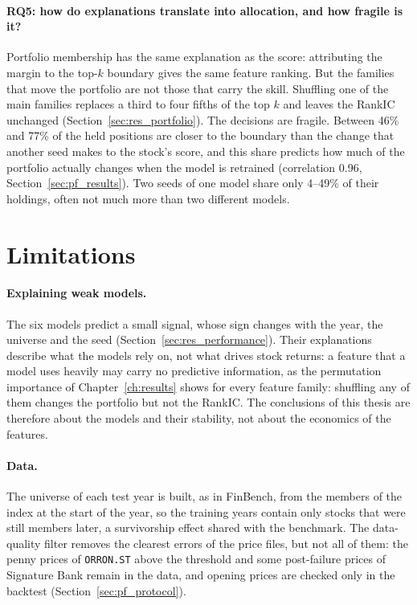 \paragraph{RQ5: how do explanations translate into allocation, and how fragile is it?} Portfolio membership has the same explanation as the score: attributing the margin to the top-$k$ boundary gives the same feature ranking. But the families that move the portfolio are not those that carry the skill. Shuffling one of the main families replaces a third to four fifths of the top $k$ and leaves the RankIC unchanged (Section~\ref{sec:res_portfolio}). The decisions are fragile. Between 46\% and 77\% of the held positions are closer to the boundary than the change that another seed makes to the stock's score, and this share predicts how much of the portfolio actually changes when the model is retrained (correlation 0.96, Section~\ref{sec:pf_results}). Two seeds of one model share only 4--49\% of their holdings, often not much more than two different models.

\section{Limitations}
\label{sec:conc_limitations}

\paragraph{Explaining weak models.} The six models predict a small signal, whose sign changes with the year, the universe and the seed (Section~\ref{sec:res_performance}). Their explanations describe what the models rely on, not what drives stock returns: a feature that a model uses heavily may carry no predictive information, as the permutation importance of Chapter~\ref{ch:results} shows for every feature family: shuffling any of them changes the portfolio but not the RankIC.
The conclusions of this thesis are therefore about the models and their stability, not about the economics of the features.

\paragraph{Data.} The universe of each test year is built, as in FinBench, from the members of the index at the start of the year, so the training years contain only stocks that were still members later, a survivorship effect shared with the benchmark. The data-quality filter removes the clearest errors of the price files, but not all of them: the penny prices of \texttt{ORRON.ST} above the threshold and some post-failure prices of Signature Bank remain in the data, and opening prices are checked only in the backtest (Section~\ref{sec:pf_protocol}).

